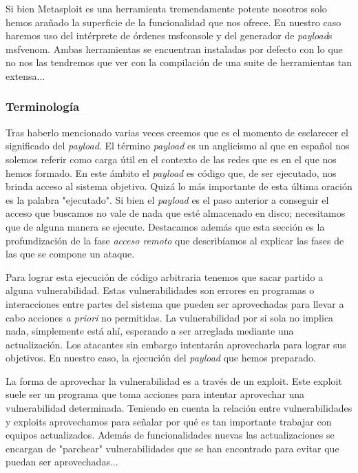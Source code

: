 \documentclass[12pt]{article}
\newcommand{\newpar} {
    \vskip 0.5cm
}
\begin{document}
                \newpar

                Si bien Metasploit es una herramienta tremendamente potente nosotros solo hemos arañado la superficie de la funcionalidad que nos ofrece. En nuestro caso haremos uso del intérprete de órdenes msfconsole y del generador de \textit{payload}s msfvenom. Ambas herramientas se encuentran instaladas por defecto con lo que no nos las tendremos que ver con la compilación de una suite de herramientas tan extensa...

            \subsubsection{Terminología}
                Tras haberlo mencionado varias veces creemos que es el momento de esclarecer el significado del \textit{payload}. El término \textit{payload} es un anglicismo al que en español nos solemos referir como carga útil en el contexto de las redes que es en el que nos hemos formado. En este ámbito el \textit{payload} es código que, de ser ejecutado, nos brinda acceso al sistema objetivo. Quizá lo más importante de esta última oración es la palabra "ejecutado". Si bien el \textit{payload} es el paso anterior a conseguir el acceso que buscamos no vale de nada que esté almacenado en disco; necesitamos que de alguna manera se ejecute. Destacamos además que esta sección es la profundización de la fase \textit{acceso remoto} que describíamos al explicar las fases de las que se compone un ataque.

                \newpar

                Para lograr esta ejecución de código arbitraria tenemos que sacar partido a alguna vulnerabilidad. Estas vulnerabilidades son errores en programas o interacciones entre partes del sistema que pueden ser aprovechadas para llevar a cabo acciones \textit{a priori} no permitidas. La vulnerabilidad por si sola no implica nada, simplemente está ahí, esperando a ser arreglada mediante una actualización. Los atacantes sin embargo intentarán aprovecharla para lograr sus objetivos. En nuestro caso, la ejecución del \textit{payload} que hemos preparado.

                \newpar

                La forma de aprovechar la vulnerabilidad es a través de un exploit. Este exploit suele ser un programa que toma acciones para intentar aprovechar una vulnerabilidad determinada. Teniendo en cuenta la relación entre vulnerabilidades y exploits aprovechamos para señalar por qué es tan importante trabajar con equipos actualizados. Además de funcionalidades nuevas las actualizaciones se encargan de "parchear" vulnerabilidades que se han encontrado para evitar que puedan ser aprovechadas...
\end{document}
